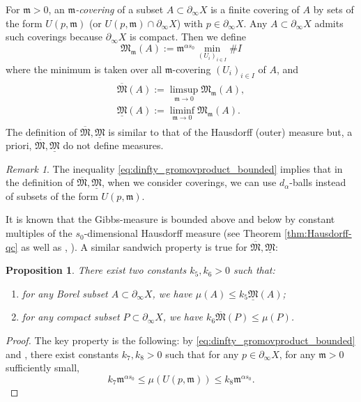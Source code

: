 \documentclass[12pt]{amsbook}%
\newtheorem{prop}[thm]{Proposition}
\theoremstyle{definition}
\theoremstyle{remark}
\newtheorem{rem}[thm]{Remark}
\numberwithin{section}{chapter}
\numberwithin{subsection}{section}
\numberwithin{figure}{chapter}
\def\dyl{>0}
\def\fm{{\mathfrak{m}}}
\def\fM{{\mathfrak{M}}}
\def\al{\alpha}
\def\geo{\partial_\infty}
\def\ol{\overline}
\begin{document}
{{For $\fm\dyl$, an \emph{$\fm$-covering} of a subset $A\subset \geo X$ is a finite covering of $A$ by sets of the form $U(p,\fm)$ (or $U(p,\fm)\cap \geo X$) with $p\in \geo X$. Any $A\subset \geo X$ admits such coverings because $\geo X$ is compact. Then we define
\begin{equation}
\fM_\fm(A):= \fm^{\alpha s_0}\min_{(U_i)_{i\in I}}\# I 
\end{equation}
where the minimum is taken over all $\fm$-covering $(U_i)_{i\in I}$ of $A$, and
\begin{align}
\begin{aligned}
\ol{\fM}(A):=\limsup_{\fm\rightarrow 0}\fM_\fm(A),\\
\underline{\fM}(A):=\liminf_{\fm\rightarrow 0}\fM_\fm(A).
\end{aligned}
\end{align}
The definition of $\ol{\fM},\underline{\fM}$ is similar to that of the Hausdorff (outer) measure but, a priori, $\ol{\fM},\underline{\fM}$ do not define measures. 

\begin{rem}\label{rem:boxcounting_upt}
The inequality \eqref{eq:dinfty_gromovproduct_bounded} implies that in the definition of $\ol{\fM},\underline{\fM}$, when we consider coverings, we can use $d_\al$-balls instead of subsets of the form $U(p,\fm)$.
\end{rem}

It is known that the Gibbs-measure is bounded above and below by constant multiples of the $s_0$-dimensional Hausdorff measure 
(see Theorem \ref{thm:Hausdorff-qc} as well as 
\cite{Coo93}, \cite{Calegari}). A similar sandwich property is true for $\ol{\fM},\underline{\fM}$:
\begin{prop}\label{prop:box_counting_measure}
There exist two constants $k_5,k_6\dyl$ such that: 
\begin{enumerate}
\item for any Borel subset $A\subset \geo X$, we have $\mu(A)\leqslant k_5 \underline{\fM}(A)$;
\item for any compact subset $P\subset \geo X$, we have $
k_6\ol{\fM}(P)\leqslant \mu(P)$.
\end{enumerate}
\end{prop}
\begin{proof}
The key property is the following: by \eqref{eq:dinfty_gromovproduct_bounded} and \cite[Proposition 7.4]{Coo93}, there exist constants $k_7,k_8\dyl$ such that for any $p\in \geo X$, for any $\fm\dyl$ sufficiently small, 
\[
k_7 \fm^{\alpha s_0}\leqslant \mu\left(U(p,\fm)\right)\leqslant k_8 \fm^{\alpha s_0}.
\]


\end{proof}}}
\end{document}
